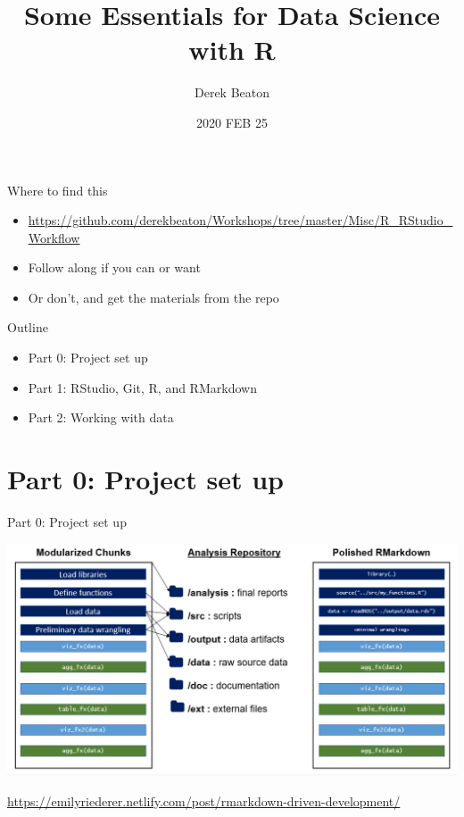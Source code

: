 \documentclass[
  ignorenonframetext,
]{beamer}
\title{Some Essentials for Data Science with R}
\author{Derek Beaton}
\date{2020 FEB 25}
\providecommand{\tightlist}{%
  \setlength{\itemsep}{0pt}\setlength{\parskip}{0pt}}
\begin{document}
\frame{\titlepage}

\begin{frame}{Where to find this}
\protect\hypertarget{where-to-find-this}{}

\begin{itemize}[<+->]
\tightlist
\item
  \url{https://github.com/derekbeaton/Workshops/tree/master/Misc/R_RStudio_Workflow}
\item
  Follow along if you can or want
\item
  Or don't, and get the materials from the repo
\end{itemize}

\end{frame}

\begin{frame}{Outline}
\protect\hypertarget{outline}{}

\begin{itemize}[<+->]
\tightlist
\item
  Part 0: Project set up
\item
  Part 1: RStudio, Git, R, and RMarkdown
\item
  Part 2: Working with data
\end{itemize}

\end{frame}

\hypertarget{part-0-project-set-up}{%
\section{Part 0: Project set up}\label{part-0-project-set-up}}

\begin{frame}{Part 0: Project set up}

\includegraphics{../external/images/setup_4_markdown_project.PNG}

\url{https://emilyriederer.netlify.com/post/rmarkdown-driven-development/}

\end{frame}
\end{document}

